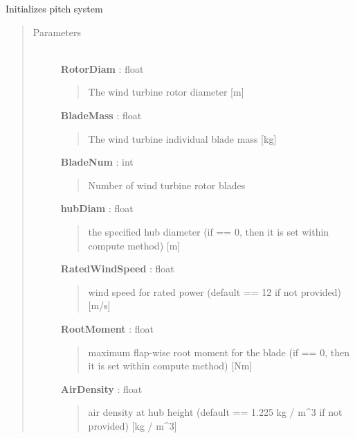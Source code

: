 \documentclass[letterpaper,10pt,openany,oneside]{sphinxmanual}
\begin{document}
\begin{fulllineitems}
\label{documentation:nacelleSE.src.hub_components.PitchSystem}
Initializes pitch system
\begin{quote}\begin{description}
\item[{Parameters }] \leavevmode\\
\textbf{RotorDiam} : float
\begin{quote}

The wind turbine rotor diameter {[}m{]}
\end{quote}

\textbf{BladeMass} : float
\begin{quote}

The wind turbine individual blade mass {[}kg{]}
\end{quote}

\textbf{BladeNum} : int
\begin{quote}

Number of wind turbine rotor blades
\end{quote}

\textbf{hubDiam} : float
\begin{quote}

the specified hub diameter (if == 0, then it is set within compute method) {[}m{]}
\end{quote}

\textbf{RatedWindSpeed} : float
\begin{quote}

wind speed for rated power (default == 12 if not provided) {[}m/s{]}
\end{quote}

\textbf{RootMoment} : float
\begin{quote}

maximum flap-wise root moment for the blade (if == 0, then it is set within compute method) {[}Nm{]}
\end{quote}

\textbf{AirDensity} : float
\begin{quote}

air density at hub height (default == 1.225 kg / m\textasciicircum{}3 if not provided) {[}kg / m\textasciicircum{}3{]}
\end{quote}


\end{description}
\end{quote}
\end{fulllineitems}
\end{document}
